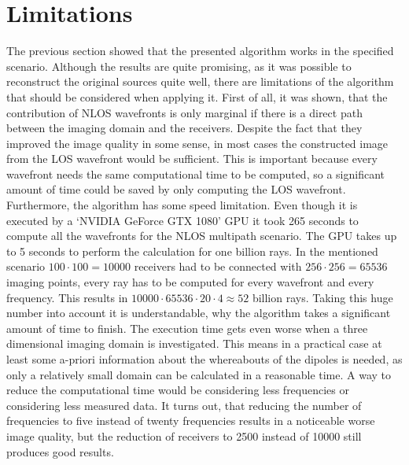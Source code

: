 \section{Limitations}
The previous section showed that the presented algorithm works in the specified scenario.
Although the results are quite promising, as it was possible to reconstruct the original sources quite well, there are limitations of the algorithm that should be considered when applying it.
First of all, it was shown, that the contribution of NLOS wavefronts is only marginal if there is a direct path between the imaging domain and the receivers.
Despite the fact that they improved the image quality in some sense, in most cases the constructed image from the LOS wavefront would be sufficient.
This is important because every wavefront needs the same computational time to be computed, so a significant amount of time could be saved by only computing the LOS wavefront.
Furthermore, the algorithm has some speed limitation.
Even though it is executed by a `NVIDIA GeForce GTX 1080' GPU it took 265 seconds to compute all the wavefronts for the NLOS multipath scenario.
The GPU takes up to 5 seconds to perform the calculation for one billion rays.
In the mentioned scenario \(100 \cdot 100 = 10000\) receivers had to be connected with \(256 \cdot 256 = 65536\) imaging points, every ray has to be computed for every wavefront and every frequency.
This results in \(10000 \cdot 65536 \cdot 20 \cdot 4 \approx 52\) billion rays.
Taking this huge number into account it is understandable, why the algorithm takes a significant amount of time to finish.
The execution time gets even worse when a three dimensional imaging domain is investigated.
This means in a practical case at least some a-priori information about the whereabouts of the dipoles is needed, as only a relatively small domain can be calculated in a reasonable time.
A way to reduce the computational time would be considering less frequencies or considering less measured data.
It turns out, that reducing the number of frequencies to five instead of twenty frequencies results in a noticeable worse image quality, but the reduction of receivers to 2500 instead of 10000 still produces good results.


